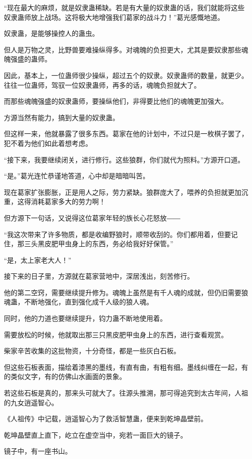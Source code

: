 \begin{this_body}
“现在最大的麻烦，就是奴隶蛊稀缺。若是有大量的奴隶蛊的话，我们就能将这些奴隶蛊师放上战场。这将极大地增强我们葛家的战斗力！”葛光感慨地道。

奴隶蛊，是能够操控人的蛊虫。

但人是万物之灵，比野兽要难操纵得多。对魂魄的负担更大，尤其是要奴隶那些魂魄强盛的蛊师。

因此，基本上，一位蛊师很少操纵，超过五个的奴隶。奴隶蛊师的数量，就更少。往往一位蛊师，驾驭一位奴隶蛊师，再多的话，魂魄负担就大了。

而那些魂魄强盛的奴隶蛊师，要操纵他们，非得要比他们的魂魄更加强大。

方源当然有能力，搞到大量的奴隶蛊。

但这样一来，他就暴露了很多东西。葛家在他的计划中，不过只是一枚棋子罢了，犯不着为他们如此着想考虑。

“接下来，我要继续闭关，进行修行。这些狼群，你们就代为照料。”方源开口道。

“是。”葛光连忙恭谨地答道，心中却是暗暗叫苦。

现在葛家扩张膨胀，正是用人之际，劳力紧缺。狼群庞大了，喂养的负担就更加沉重，这得消耗葛家多大的劳力啊！

但方源下一句话，又说得这位葛家年轻的族长心花怒放――

“我这次带来了许多物质，都是收编野狼时，顺带收刮的。你们都用着，但要记住，那三头黑皮肥甲虫身上的东西，务必给我好好保管。”

“是，太上家老大人！”

接下来的日子里，方源就在葛家营地中，深居浅出，刻苦修行。

他的第二空窍，需要继续提升修为。魂魄上虽然是有千人魂的成就，但仍旧需要狼魂蛊，不断地强化，直到强化成千人级的狼人魂。

同时，他的力道也要继续提升，钧力蛊不断地使用着。

需要放松的时候，他就取出那三只黑皮肥甲虫身上的东西，进行查看观赏。

柴家辛苦收集的这批物资，十分奇怪，都是一些灰白石板。

但这些石板表面，描绘着漆黑的墨线，有直有曲，有粗有细。墨线纠缠在一起，有的类似文字，有的仿佛山水画面的景象。

若这些石板是真的，那来头可就大了。往源头推溯，那可得追究到太古年间，人祖的九女逍遥智心。

《人祖传》中记载，逍遥智心为了救活智慧蛊，便来到乾坤晶壁前。

乾坤晶壁直上直下，屹立在虚空当中，宛若一面巨大的镜子。

镜子中，有一座书山。


\end{this_body}
